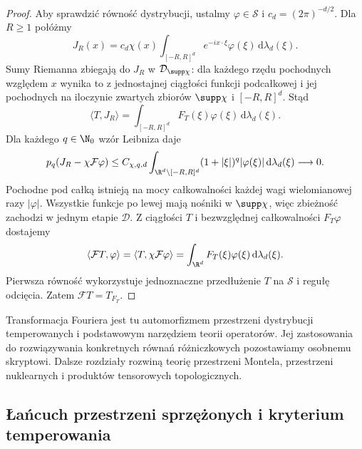 \begin{proof}
Aby sprawdzić równość dystrybucji, ustalmy
$\varphi\in\mathcal S$ i $c_d=(2\pi)^{-d/2}$.
Dla $R\ge1$ połóżmy
\[
 J_R(x)=c_d\chi(x)\int_{[-R,R]^d}
 e^{-ix\cdot\xi}\varphi(\xi)\,\mathrm d\lambda_d(\xi).
\]
Sumy Riemanna zbiegają do $J_R$ w
$\mathcal D_{\supp\chi}$: dla każdego rzędu pochodnych
względem $x$ wynika to z jednostajnej ciągłości funkcji
podcałkowej i jej pochodnych na iloczynie zwartych
zbiorów $\supp\chi$ i $[-R,R]^d$.
Stąd
\[
 \langle T,J_R\rangle=
 \int_{[-R,R]^d}F_T(\xi)\varphi(\xi)
 \,\mathrm d\lambda_d(\xi).
\]
Dla każdego $q\in\N_0$ wzór Leibniza daje
\[
 p_q(J_R-\chi\mathcal F\varphi)
 \le C_{\chi,q,d}\int_{\R^d\setminus[-R,R]^d}
 (1+|\xi|)^q|\varphi(\xi)|\,\mathrm d\lambda_d(\xi)
 \longrightarrow0.
\]
Pochodne pod całką istnieją na mocy całkowalności
każdej wagi wielomianowej razy $|\varphi|$.
Wszystkie funkcje po lewej mają nośniki w $\supp\chi$,
więc zbieżność zachodzi w jednym etapie $\mathcal D$.
Z ciągłości $T$ i bezwzględnej całkowalności
$F_T\varphi$ dostajemy
\[
 \langle\mathcal FT,\varphi\rangle
 =\langle T,\chi\mathcal F\varphi\rangle
 =\int_{\R^d}F_T(\xi)\varphi(\xi)
 \,\mathrm d\lambda_d(\xi).
\]
Pierwsza równość wykorzystuje jednoznaczne przedłużenie
$T$ na $\mathcal S$ i regułę odcięcia.
Zatem $\mathcal FT=T_{F_T}$.
\end{proof}

\begin{uwaga}
\label{rem:scope22}
Transformacja Fouriera jest tu automorfizmem przestrzeni
dystrybucji temperowanych i podstawowym narzędziem teorii
operatorów. Jej zastosowania do rozwiązywania konkretnych
równań różniczkowych pozostawiamy osobnemu skryptowi.
Dalsze rozdziały rozwiną teorię przestrzeni Montela,
przestrzeni nuklearnych i produktów tensorowych topologicznych.
\end{uwaga}

\subsection{Łańcuch przestrzeni sprzężonych i kryterium temperowania}

